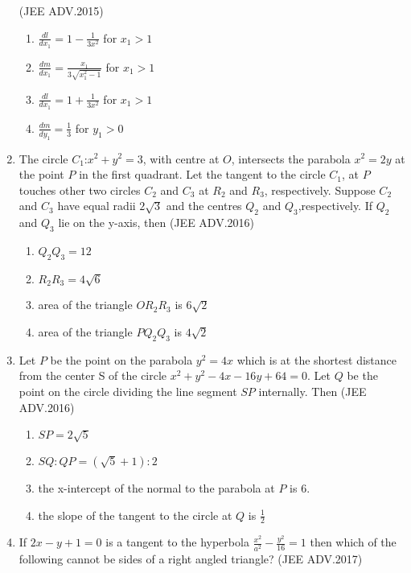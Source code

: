 \documentclass[journal,12pt,onecolumn]{IEEEtran}
\theoremstyle{remark}
\begin{document}
\begin{enumerate}
	      \hfill(JEE ADV.2015)
	      
	      \begin{enumerate}
		      \item $\frac{dl}{dx_1}=1-\frac{1}{3x^2}$ for $x_1>1$ 
		      \item $\frac{dm}{dx_1}=\frac{x_1}{3\sqrt{x_1^2-1}}$ for $x_1>1$ 
		      \item $\frac{dl}{dx_1}=1+\frac{1}{3x^2}$ for $x_1>1$
		      \item $\frac{dm}{dy_1}=\frac{1}{3}$ for $y_1>0$ 
	      \end{enumerate}
      \item The circle $C_1$:$x^2+y^2=3$, with centre at $O$, intersects the parabola $x^2=2y$ at the point $P$ in the first quadrant. Let the tangent to the circle $C_1$, at $P$ touches other two circles $C_2$ and $C_3$ at $R_2$ and $R_3$, respectively. Suppose $C_2$ and $C_3$ have equal radii $2\sqrt{3}$ and the centres $Q_2$ and $Q_3$,respectively. If $Q_2$ and $Q_3$ lie on the y-axis, then 
	      \hfill(JEE ADV.2016)
	      
	      \begin{enumerate}
		      \item $Q_2Q_3=12$
		      \item $R_2R_3=4\sqrt{6}$
		      \item area of the triangle $OR_2R_3$ is $6\sqrt{2}$
		      \item area of the triangle $PQ_2Q_3$ is $4\sqrt{2}$
	      \end{enumerate}
      \item Let $P$ be the point on the parabola $y^2=4x$ which is at the shortest distance from the center S of the circle $x^2+y^2-4x-16y+64=0$. Let $Q$ be the point on the circle
	      dividing the line segment $SP$ internally. Then 
	      \hfill(JEE ADV.2016)
	      
	      \begin{enumerate}
		      \item $SP=2\sqrt{5}$
		      \item $SQ:QP=(\sqrt{5}+1):2$
		      \item the x-intercept of the normal to the parabola at $P$ is $6$.
		      \item the slope of the tangent to the circle at $Q$ is $\frac{1}{2}$
		      
	      \end{enumerate}
      \item If $2x-y+1=0$ is a tangent to the hyperbola $\frac{x^2}{a^2}-\frac{y^2}{16}=1$ then which of the following cannot be sides of a right angled triangle? 
	      \hfill(JEE ADV.2017)
	      

\end{enumerate}
\end{document}
